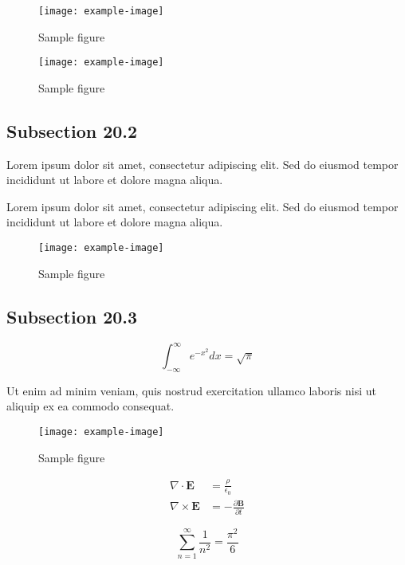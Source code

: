 \documentclass{article}
\begin{document}
\begin{figure}[h]
    \centering
    \texttt{[image: example-image]}
    \caption{Sample figure}
    \label{fig:sample}
\end{figure}

\begin{figure}[h]
    \centering
    \texttt{[image: example-image]}
    \caption{Sample figure}
    \label{fig:sample}
\end{figure}

\subsection{Subsection 20.2}

Lorem ipsum dolor sit amet, consectetur adipiscing elit. Sed do eiusmod tempor incididunt ut labore et dolore magna aliqua.

Lorem ipsum dolor sit amet, consectetur adipiscing elit. Sed do eiusmod tempor incididunt ut labore et dolore magna aliqua.

\begin{figure}[h]
    \centering
    \texttt{[image: example-image]}
    \caption{Sample figure}
    \label{fig:sample}
\end{figure}

\subsection{Subsection 20.3}

\begin{equation}
    \int_{-\infty}^{\infty} e^{-x^2} dx = \sqrt{\pi}
\end{equation}

Ut enim ad minim veniam, quis nostrud exercitation ullamco laboris nisi ut aliquip ex ea commodo consequat.

\begin{figure}[h]
    \centering
    \texttt{[image: example-image]}
    \caption{Sample figure}
    \label{fig:sample}
\end{figure}

\begin{align}
    \nabla \cdot \mathbf{E} &= \frac{\rho}{\epsilon_0} \\
    \nabla \times \mathbf{E} &= -\frac{\partial \mathbf{B}}{\partial t}
\end{align}

\begin{equation}
    \sum_{n=1}^{\infty} \frac{1}{n^2} = \frac{\pi^2}{6}
\end{equation}
\end{document}

